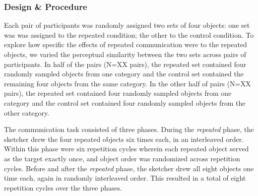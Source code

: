 \documentclass[10pt,letterpaper]{article}
\begin{document}


\subsubsection{Design \& Procedure}

Each pair of participants was randomly assigned two sets of four objects: one set was was assigned to the repeated condition; the other to the control condition.
To explore how specific the effects of repeated communication were to the repeated objects, we varied the perceptual similarity between the two sets across pairs of participants.
In half of the pairs (N=XX pairs), the repeated set contained four randomly sampled objects from one category and the control set contained the remaining four objects from the same category.
In the other half of pairs (N=XX pairs), the repeated set contained four randomly sampled objects from one category and the control set contained four randomly sampled objects from the other category.


The communication task consisted of three phases.
During the \textit{repeated} phase, the sketcher drew the four repeated objects six times each, in an interleaved order.
Within this phase were six repetition cycles wherein each repeated object served as the target exactly once, and object order was randomized across repetition cycles.
Before and after the \textit{repeated} phase, the sketcher drew all eight objects one time each, again in randomly interleaved order. This resulted in a total of eight repetition cycles over the three phases.

\end{document}
